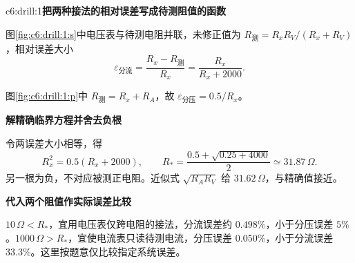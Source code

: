 \LectureAnswerSection

\begin{drillsolution}{c6:drill:1}\textbf{把两种接法的相对误差写成待测阻值的函数}\par\nobreak

图\ref{fig:c6:drill:1:s}中电压表与待测电阻并联，未修正值为 $R_{\text{测}}=R_xR_V/(R_x+R_V)$，相对误差大小
\[
\varepsilon_{\text{分流}}=\frac{R_x-R_{\text{测}}}{R_x}
=\frac{R_x}{R_x+2000}.
\]


图\ref{fig:c6:drill:1:p}中 $R_{\text{测}}=R_x+R_A$，故 $\varepsilon_{\text{分压}}=0.5/R_x$。


\par\medskip{}\noindent\textbf{解精确临界方程并舍去负根}\par\nobreak

令两误差大小相等，得
\[
R_x^2=0.5(R_x+2000),\qquad
R_*=\frac{0.5+\sqrt{0.25+4000}}2\simeq31.87\,\Omega.
\]
另一根为负，不对应被测正电阻。近似式 $\sqrt{R_AR_V}$ 给 $31.62\,\Omega$，与精确值接近。


\par\medskip{}\noindent\textbf{代入两个阻值作实际误差比较}\par\nobreak

$10\,\Omega<R_*$，宜用电压表仅跨电阻的接法，分流误差约 $0.498\%$，小于分压误差 $5\%$。$1000\,\Omega>R_*$，宜使电流表只读待测电流，分压误差 $0.050\%$，小于分流误差 $33.3\%$。这里按题意仅比较指定系统误差。
\end{drillsolution}
